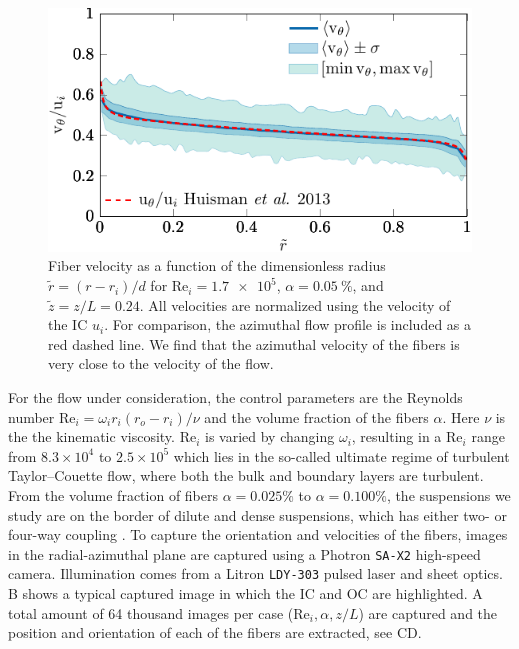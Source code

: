 \begin{figure}[htp] %
\centering
\includegraphics{figure6afibervelocity}
\caption{Fiber velocity as a function of the dimensionless radius
$\tilde{r}=(r-r_i)/d$ for $\text{Re}_i=\num{1.7e5}$, $\alpha =
\SI{0.05}{\percent}$, and $\tilde{z} = z/L = 0.24$. All velocities are
normalized using the velocity of the IC $u_i$. For comparison, the
azimuthal flow profile is included as a red dashed line.  We find that the
azimuthal velocity of the fibers is very close to the velocity of the flow.}
\label{fig:fibervelocity}
\end{figure}
%
For the flow under consideration, the control parameters
are the Reynolds number $\text{Re}_i=\omega_i r_i (r_o - r_i)/\nu$ and the
volume fraction of the fibers $\alpha$. Here $\nu$ is the the kinematic viscosity.  $\text{Re}_i$ is varied by changing $\omega_i$, resulting in a $\text{Re}_i$
range from $8.3 \times 10^4$ to $2.5\times10^5$ which lies in the so-called
ultimate regime \cite{Lathrop1992, vanGils2011, Huisman2012b,
Ostilla-Monico2014} of
turbulent Taylor--Couette flow, where both the bulk and boundary layers
are turbulent. From the volume fraction of fibers $\alpha=0.025\%$ to
$\alpha=0.100\%$, the suspensions we study are on the border of dilute and
dense suspensions, which has either two- or four-way coupling
\cite{Elghobashi1994}. 
%
To capture the orientation and velocities of the fibers, images in the
radial-azimuthal plane are captured using a Photron \texttt{SA-X2} high-speed
camera. Illumination comes from a Litron \texttt{LDY-303} pulsed laser and sheet optics.
B shows a typical captured image in which the IC and OC are highlighted.
A total amount of 64 thousand images per case
($\text{Re}_i, \alpha, z/L$) are captured and the position and orientation of
each of the fibers are extracted, see CD. 
